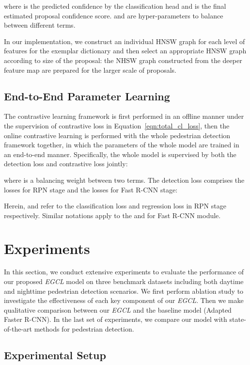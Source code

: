 \documentclass[journal]{IEEEtran}
\begin{document}
where  is the predicted confidence by the classification head and  is the final estimated proposal confidence score.  and  are hyper-parameters to balance between different terms. 

In our implementation, we construct an individual HNSW graph for each level of features for the exemplar dictionary and then select an appropriate HNSW graph according to size of the proposal: the NHSW graph constructed from the deeper feature map are prepared for the larger scale of proposals. 


\subsection{End-to-End Parameter Learning}
The contrastive learning framework is first performed in an offline manner under the supervision of contrastive loss in Equation~\ref{eqn:total_cl_loss}, then the online contrastive learning is performed with the whole pedestrian detection framework together, in which the parameters of the whole model are trained in an end-to-end manner. Specifically, the whole model is supervised by both the detection loss  and contrastive loss  jointly:

where  is a balancing weight between two terms. The detection loss  comprises the losses for RPN stage and the losses for Fast R-CNN stage:

Herein,  and  refer to the classification loss and regression loss in RPN stage respectively. Similar notations apply to the  and  for Fast R-CNN module.




\section{Experiments}
In this section, we conduct extensive experiments to evaluate the performance of our proposed \emph{EGCL} model on three benchmark datasets including both daytime and nighttime pedestrian detection scenarios. We first perform ablation study to investigate the effectiveness of each key component of our \emph{EGCL}. Then we make qualitative comparison between our \emph{EGCL} and the baseline model (Adapted Faster R-CNN). In the last set of experiments, we compare our model with state-of-the-art methods for pedestrian detection.
\subsection{Experimental Setup}
\end{document}
